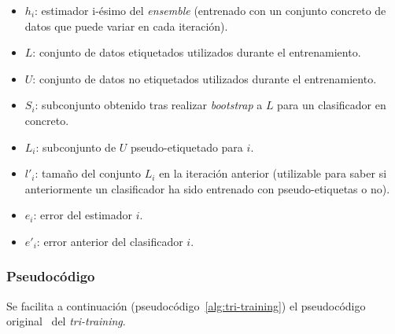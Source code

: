 \begin{itemize}
	\item $h_{i}$: estimador i-ésimo del \textit{ensemble} (entrenado con un conjunto concreto de datos que puede variar en cada iteración).
	\item $L$: conjunto de datos etiquetados utilizados durante el entrenamiento.
	\item $U$: conjunto de datos no etiquetados utilizados durante el entrenamiento.
	\item $S_{i}$: subconjunto obtenido tras realizar \textit{bootstrap} a $L$ para un clasificador en concreto.
	\item $L_{i}$: subconjunto de $U$ pseudo-etiquetado para $i$.
	\item $l'_{i}$: tamaño del conjunto $L_i$ en la iteración anterior (utilizable para saber si anteriormente un clasificador ha sido entrenado con pseudo-etiquetas o no).	
	\item $e_{i}$: error del estimador $i$.	
	\item $e'_{i}$: error anterior del clasificador $i$.	
\end{itemize} 

\subsubsection{Pseudocódigo}
Se facilita a continuación (pseudocódigo~\ref{alg:tri-training}) el pseudocódigo original~\cite{tritraining2005@original} del \textit{tri-training}.

